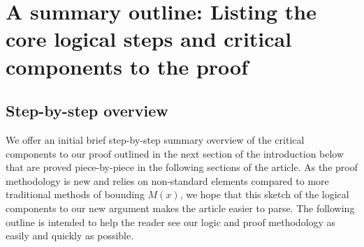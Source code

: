\documentclass[11pt,reqno,a4letter]{article}
\numberwithin{figure}{section}
\numberwithin{table}{section}
\theoremstyle{plain}
\numberwithin{theorem}{section}
\theoremstyle{definition}
\begin{document}
\newpage
\section{A summary outline: Listing the core logical steps and critical components to the proof} 

\subsection{Step-by-step overview} 

We offer an initial brief step-by-step summary overview of the critical components 
to our proof outlined in the next section of the introduction below 
that are proved piece-by-piece in the following sections of the article. 
As the proof methodology is new and relies on non-standard elements compared to more 
traditional methods of bounding $M(x)$, we hope that this sketch of the logical components 
to our new argument makes the article easier to parse. 
The following outline is intended to help 
the reader see our logic and proof methodology as easily and quickly as possible. 
\end{document}

